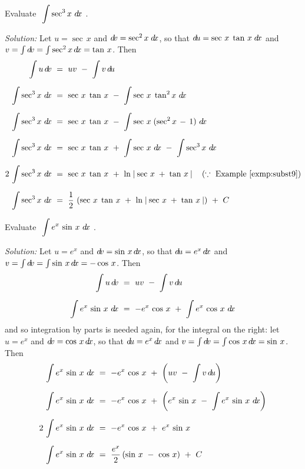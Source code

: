 \begin{exmp}\label{exmp:intparts7}
\noindent Evaluate $~\displaystyle\int \sec^3 x~d\!x~$.\vspace{1mm}
\par\noindent\emph{Solution:} Let $u=\sec\,x$ and $d\!v=\sec^2 x\;d\!x$, so that
$d\!u = \sec\,x\;\tan\,x\;d\!x$ and
$v = \int d\!v = \int \sec^2 x\,d\!x = \tan\,x$. Then
\begin{align*}
\int u\,\dv ~&=~ uv ~-~ \int v\,\du\\[6pt]
\int \sec^3 x~\dx ~&=~ \sec\,x\;\tan\,x ~-~ \int \sec\,x\;\tan^2 x~\dx\\[6pt]
\int \sec^3 x~\dx ~&=~ \sec\,x\;\tan\,x ~-~ \int \sec\,x\;(\sec^2 x \,-\, 1)~\dx\\[6pt]
\int \sec^3 x~\dx ~&=~ \sec\,x\;\tan\,x ~+~ \int \sec\,x~\dx ~-~ \int \sec^3 x~\dx\\[6pt]
2\,\int \sec^3 x~\dx ~&=~ \sec\,x\;\tan\,x ~+~
 \ln\;\abs{\,\sec\,x \;+\; \tan\,x\,} \quad\left(\because~\text{Example}~\ref{exmp:subst9}\right)\\[6pt]
\int \sec^3 x~\dx ~&=~ \frac{1}{2}\,\left(\sec\,x\;\tan\,x ~+~
 \ln\;\abs{\,\sec\,x \;+\; \tan\,x\,}\right) ~+~ C
\end{align*}
\end{exmp}
\begin{exmp}\label{exmp:intparts8}
\noindent Evaluate $~\displaystyle\int e^x\,\sin\,x~d\!x~$.\vspace{1mm}
\par\noindent\emph{Solution:} Let $u=e^x$ and $d\!v=\sin\,x\,d\!x$, so
that $d\!u = e^x\,d\!x$ and $v = \int d\!v = \int \sin\,x\,d\!x = -\cos\,x$. Then
\begin{align*}
\int u\,d\!v ~&=~ uv ~-~ \int v\,d\!u\\[6pt]
\int e^x\,\sin\,x~d\!x ~&=~ -e^x\,\cos\,x ~+~ \int e^x\,\cos\,x~d\!x
\end{align*}
and so integration by parts is needed again, for the integral on the right: let
$u=e^x$ and $d\!v=\cos\,x\,d\!x$, so that $d\!u = e^x\,d\!x$ and
$v = \int d\!v = \int \cos\,x\,d\!x = \sin\,x$. Then
\begin{align*}
\int e^x\,\sin\,x~d\!x ~&=~ -e^x\,\cos\,x ~+~ \left(uv ~-~ \int v\,d\!u\right)\\[6pt]
\int e^x\,\sin\,x~d\!x ~&=~ -e^x\,\cos\,x ~+~ \left(e^x\,\sin\,x ~-~ \int e^x\,\sin\,x~d\!x\right)\\[6pt]
2\,\int e^x\,\sin\,x~d\!x ~&=~ -e^x\,\cos\,x ~+~ e^x\,\sin\,x\\[6pt]
\int e^x\,\sin\,x~d\!x ~&=~ \frac{e^x}{2}\,(\sin\,x ~-~ \cos\,x) ~+~ C
\end{align*}
\end{exmp}
